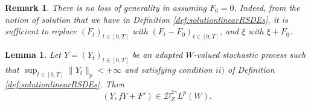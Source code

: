 \documentclass[11pt,a4paper]{article}
\theoremstyle{plain}
\newtheorem{rmk}[defn]{Remark}
\newtheorem{lemma}[defn]{Lemma}
\begin{document}
\begin{rmk}
    There is no loss of generality in assuming $F_0=0$. Indeed, from the notion of solution that we have in Definition \ref{def:solutionlinearRSDEs}, it is sufficient to replace $(F_t)_{t \in [0,T]}$ with \linebreak $(F_t-F_0)_{t\in [0,T]}$, and $\xi$ with $\xi + F_0$.
\end{rmk}

\begin{lemma} \label{lemma:solutionsoflinearRSDEsarecontrolled}
    Let $Y=(Y_t)_{t \in [0,T]}$ be an adapted $W$-valued stochastic process such that $\sup_{t \in [0,T]} \|Y_t\|_p < +\infty$ and satisfying condition $ii)$ of Definition \ref{def:solutionlinearRSDEs}.
    Then \begin{equation*}
        (Y,fY+F')\in \mathscr{D}^{2\gamma}_ZL^p(W).  
    \end{equation*}
\end{lemma}
\end{document}
